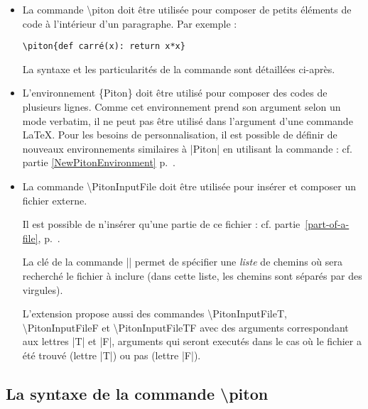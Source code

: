 \documentclass[dvipsnames,svgnames]{article}
\begin{document}
\begin{itemize} \setlength{\fboxsep}{1pt}
\item La commande \colorbox{gray!20}{\ttfamily \textbackslash piton} doit être utilisée pour composer de petits éléments de code à l'intérieur d'un
paragraphe. Par exemple : 

{\color{gray}\verb|\piton{def carré(x): return x*x}|}\qquad 
{}

La syntaxe et les particularités de la commande sont détaillées ci-après.


\item L'environnement \colorbox{gray!20}{\ttfamily \{Piton\}} doit être utilisé pour composer des codes de
plusieurs lignes. Comme cet environnement prend son argument selon un mode verbatim, il ne peut pas être utilisé
dans l'argument d'une commande LaTeX. Pour les besoins de personnalisation, il est possible de définir de nouveaux
environnements similaires à |{Piton}| en utilisant la commande  : cf. partie
\ref{NewPitonEnvironment} p.~\pageref{NewPitonEnvironment}.

\item La commande \colorbox{gray!20}{\ttfamily \textbackslash PitonInputFile} doit être utilisée pour insérer et
composer un fichier externe.

Il est possible de n'insérer qu'une partie de ce fichier : cf. partie~\ref{part-of-a-file},
p.~\pageref{part-of-a-file}.

La clé  de la commande |\PitonOptions| permet de spécifier une \emph{liste} de chemins où sera
recherché le fichier à inclure (dans cette liste, les chemins sont séparés par des virgules).

L'extension  propose aussi des commandes \colorbox{gray!20}{\ttfamily\textbackslash PitonInputFileT}, 
\colorbox{gray!20}{\ttfamily \textbackslash PitonInputFileF} et
\colorbox{gray!20}{\ttfamily \textbackslash PitonInputFileTF} avec des arguments correspondant aux lettres |T| et
|F|, arguments qui seront executés dans le
cas où le fichier a été trouvé (lettre |T|) ou pas (lettre |F|).

\end{itemize}


\subsection{La syntaxe de la commande \textbackslash piton}
\end{document}
